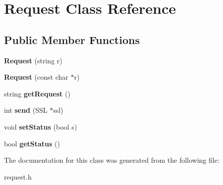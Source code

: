 \hypertarget{classRequest}{\section{Request Class Reference}
\label{classRequest}
}
\subsection*{Public Member Functions}
\begin{DoxyCompactItemize}
\item 
\hypertarget{classRequest_af31aa2e5b8791bd30f43143cdf2c6380}{{\bfseries Request} (string r)}\label{classRequest_af31aa2e5b8791bd30f43143cdf2c6380}

\item 
\hypertarget{classRequest_a179fe950975b1275dd4c51e1cf9cc59e}{{\bfseries Request} (const char $\ast$r)}\label{classRequest_a179fe950975b1275dd4c51e1cf9cc59e}

\item 
\hypertarget{classRequest_a22717bb4db88521da28a05bcc6f89813}{string {\bfseries get\-Request} ()}\label{classRequest_a22717bb4db88521da28a05bcc6f89813}

\item 
\hypertarget{classRequest_a49a120aeb1aaba706e98ed17d3ce624e}{int {\bfseries send} (S\-S\-L $\ast$ssl)}\label{classRequest_a49a120aeb1aaba706e98ed17d3ce624e}

\item 
\hypertarget{classRequest_abdb4be33d8697e3ef5da9bbc5eadf297}{void {\bfseries set\-Status} (bool s)}\label{classRequest_abdb4be33d8697e3ef5da9bbc5eadf297}

\item 
\hypertarget{classRequest_ae1ddbe9c5bfabc193b44b31bebc5a59c}{bool {\bfseries get\-Status} ()}\label{classRequest_ae1ddbe9c5bfabc193b44b31bebc5a59c}

\end{DoxyCompactItemize}


The documentation for this class was generated from the following file\-:\begin{DoxyCompactItemize}
\item 
request.\-h\end{DoxyCompactItemize}
